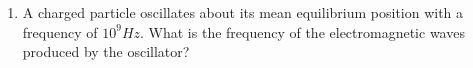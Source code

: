 \begin{enumerate}[label=\thesection.\arabic*,ref=\thesection.\theenumi]
\item A charged particle oscillates about its mean equilibrium position with a frequency of $10^9Hz$. What is the frequency of the electromagnetic waves produced by the oscillator?\\
\solution


\end{enumerate}
